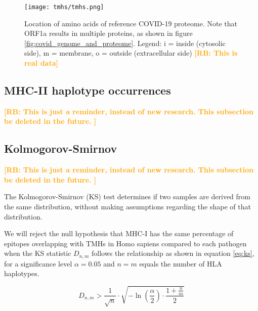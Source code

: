 \documentclass{article}
\newcommand{\richel}[1]{\textcolor{orange}{\textbf{[RB: #1]}}}
\begin{document}
\begin{figure}[!htbp]
  \texttt{[image: tmhs/tmhs.png]}
  \caption{
    Location of amino acids of reference COVID-19 proteome.
    Note that ORF1a results in multiple proteins, 
    as shown in figure \ref{fig:covid_genome_and_proteome}.
    Legend: i = inside (cytosolic side), m = membrane, o = outside (extracellular side)
    \richel{This is real data}
  }
  \label{fig:covid_locatome}
\end{figure}


\subsection{MHC-II haplotype occurrences}

\richel{
  This is just a reminder, instead of new research. 
  This subsection be deleted in the future.
}

\begin{table}
  
  \caption{
    Percentage of MHC-II haplotypes, from \cite{greenbaum2011functional}
    \richel{
      This is just a reminder, instead of new research. 
      This table be deleted in the future.
    }
  }
  \label{table:mhc2_haplotypes}
\end{table}

\subsection{Kolmogorov-Smirnov}

\richel{
  This is just a reminder, instead of new research. 
  This subsection be deleted in the future.
}

The Kolmogorov-Smirnov (KS) test determines if two samples
are derived from the same distribution, without making assumptions
regarding the shape of that distribution. 

We will reject
the null hypothesis that MHC-I has the same percentage of epitopes 
overlapping with TMHs in Homo sapiens compared to each pathogen when 
the KS statistic $D_{n,m}$ follows the relationship as shown in 
equation \ref{eq:ks}, for a significance level $\alpha = 0.05$
and $n = m$ equals the number of HLA haplotypes.

\begin{equation}
   D_{n,m} > \frac{1}{\sqrt{n}} \cdot \sqrt{ -\ln(\frac{\alpha}{2}) \cdot \frac{1 + \frac{n}{m}}{2} }
   \label{eq:ks}
\end{equation}
\end{document}
